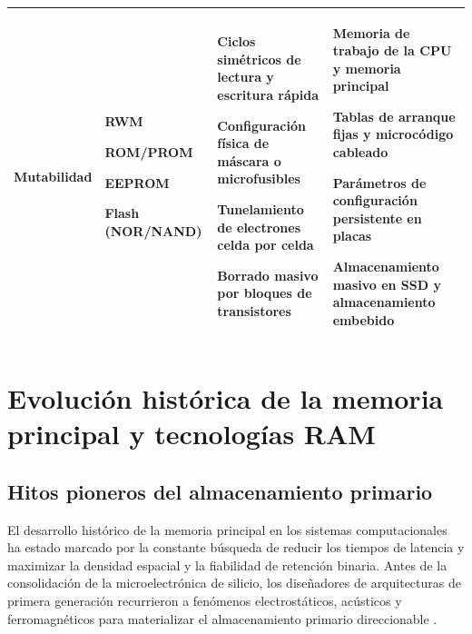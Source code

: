 \documentclass[12pt]{article}
\begin{document}
\begin{table}[htbp]
\begin{tabularx}{\textwidth}{>{\centering\arraybackslash}m{2.3cm} >{\centering\arraybackslash}m{2.9cm} X X}
\addlinespace
\textbf{Mutabilidad} & RWM \par ROM/PROM \par EEPROM \par Flash (NOR/NAND) & Ciclos simétricos de lectura y escritura rápida \par Configuración física de máscara o microfusibles \par Tunelamiento de electrones celda por celda \par Borrado masivo por bloques de transistores & Memoria de trabajo de la CPU y memoria principal \par Tablas de arranque fijas y microcódigo cableado \par Parámetros de configuración persistente en placas \par Almacenamiento masivo en SSD y almacenamiento embebido \\
\bottomrule
\end{tabularx}
\end{table}

\clearpage

\section{Evolución histórica de la memoria principal y tecnologías RAM}
\label{sec:evolucionMemoriaRam}

\subsection{Hitos pioneros del almacenamiento primario}
\label{sec:hitosPionerosPrimario}

El desarrollo histórico de la memoria principal en los sistemas computacionales ha estado marcado por la constante búsqueda de reducir los tiempos de latencia y maximizar la densidad espacial y la fiabilidad de retención binaria. Antes de la consolidación de la microelectrónica de silicio, los diseñadores de arquitecturas de primera generación recurrieron a fenómenos electrostáticos, acústicos y ferromagnéticos para materializar el almacenamiento primario direccionable \parencite[\S 2.1, p.\ 32]{mchoes2011sistemas}.
\end{document}
